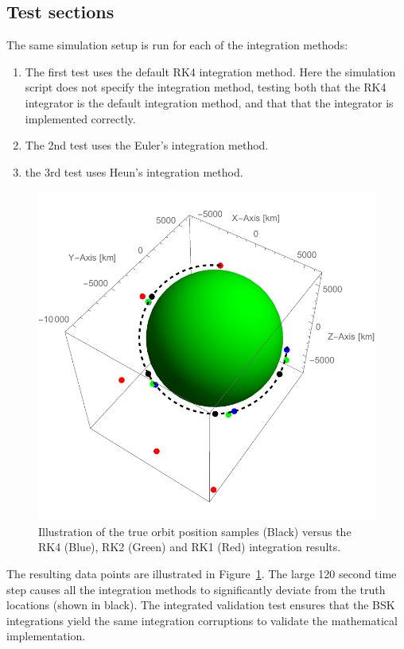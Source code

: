 \subsection{Test sections}
The same simulation setup is run for each of the integration methods:
\begin{enumerate}
\item The first test uses the default RK4 integration method.  Here the simulation script does not specify the integration method, testing both that the RK4 integrator is the default integration method, and that that the integrator is implemented correctly.  

\item The 2nd test uses the Euler's integration method.

\item the 3rd test uses Heun's integration method.  

\end{enumerate}

\begin{figure}[t]
	\centerline{
	\includegraphics[]{Figures/intResults}
	}
	\caption{Illustration of the true orbit position samples (Black) versus the RK4 (Blue), RK2 (Green) and RK1 (Red) integration results.}
	\label{fig:intResults}
\end{figure}
The resulting data points are illustrated in Figure~\ref{fig:intResults}.  The large 120 second time step causes all the integration methods to significantly deviate from the truth locations (shown in black).  The integrated validation test ensures that the BSK integrations yield the same integration corruptions to validate the mathematical implementation.  


